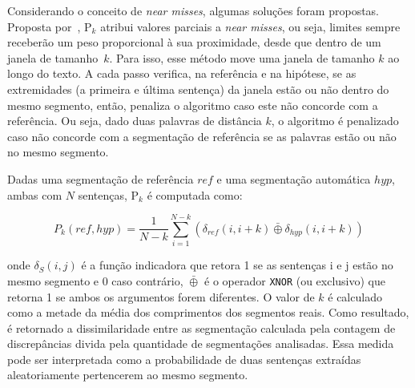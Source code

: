 \documentclass[10pt,a4paper]{article}
\begin{document}

Considerando o conceito de \textit{near misses}, algumas soluções foram propostas. Proposta por~\cite{Beeferman1999}, P$_k$ atribui valores parciais a \textit{near misses}, ou seja, limites sempre receberão um peso proporcional à sua proximidade, desde que dentro de um janela de tamanho~$k$.  Para isso, esse método move uma janela de tamanho $k$ ao longo do texto. A cada passo verifica, na referência e na hipótese, se as extremidades (a primeira e última sentença) da janela estão ou não dentro do mesmo segmento, então, penaliza o algoritmo caso este não concorde com a referência. Ou seja, dado duas palavras de distância $k$, o algoritmo é penalizado caso não concorde com a segmentação de referência se as palavras estão ou não no mesmo segmento. 

Dadas uma segmentação de referência $ref$ e uma segmentação automática $hyp$, ambas com $N$ sentenças, P$_k$ é computada como: 


\begin{equation}
P_k(ref,hyp) = \frac{1}{N - k}
\sum_{i=1}^{N-k } 
(
\delta_{ref}(i, i+k) 
\bar{\oplus}
\delta_{hyp}(i, i+k) 
)
\end{equation}


onde $\delta_S(i,j)$ é a função indicadora que retora 1 se as sentenças i e j estão no mesmo segmento e 0 caso contrário, $\bar{\oplus}$ é o operador \texttt{XNOR} (ou exclusivo) que retorna 1 se ambos os argumentos forem diferentes. 
%
%
O valor de $k$ é calculado como a metade da média dos comprimentos dos segmentos reais. Como resultado, é retornado a
dissimilaridade entre as segmentação calculada pela contagem de discrepâncias divida pela quantidade de segmentações analisadas. Essa medida pode ser interpretada como a probabilidade de duas sentenças extraídas aleatoriamente pertencerem ao mesmo segmento.  


\end{document}
